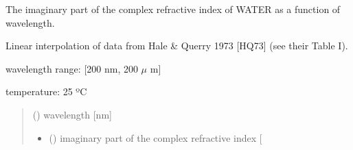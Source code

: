 \documentclass[letterpaper,10pt,english]{sphinxmanual}
\begin{document}

\begin{fulllineitems}
\label{\detokenize{03_absorption_coefficient:skinoptics.absorption_coefficient.k_wat_Hale}}
\pysigstartsignatures
{}
\pysigstopsignatures
\begin{DUlineblock}{0em}
\item[] The imaginary part of the complex refractive index of WATER as a function of wavelength.
\item[] Linear interpolation of data from Hale \& Querry 1973 {[}HQ73{]} (see their Table I).
\end{DUlineblock}

\begin{DUlineblock}{0em}
\item[] wavelength range: {[}200 nm, 200 \(\mu\) m{]}
\item[] temperature: 25 ºC
\end{DUlineblock}
\begin{quote}\begin{description}
\sphinxAtStartPar
{} () \textendash{} wavelength {[}nm{]}

\sphinxAtStartPar
\begin{itemize}
\item {} 
\sphinxAtStartPar
{} () \textendash{} imaginary part of the complex refractive index {[}\sphinxhyphen{}{]}

\end{itemize}


\end{description}\end{quote}

\end{fulllineitems}

\end{document}
